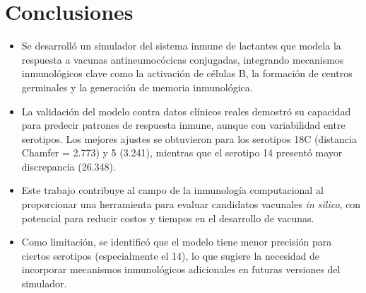 \chapter*{Conclusiones}\label{chapter:conclusions}

\begin{itemize}
    \item Se desarrolló un simulador  del sistema inmune de lactantes que modela la respuesta a vacunas antineumocócicas conjugadas, integrando mecanismos inmunológicos clave como la activación de células B, la formación de centros germinales y la generación de memoria inmunológica.

    \item La validación del modelo contra datos clínicos reales demostró su capacidad para predecir patrones de respuesta inmune, aunque con variabilidad entre serotipos. Los mejores ajustes se obtuvieron para los serotipos 18C (distancia Chamfer = 2.773) y 5 (3.241), mientras que el serotipo 14 presentó mayor discrepancia (26.348).

    \item Este trabajo contribuye al campo de la inmunología computacional al proporcionar una herramienta para evaluar candidatos vacunales \textit{in silico}, con potencial para reducir costos y tiempos en el desarrollo de vacunas. 

    \item Como limitación, se identificó que el modelo tiene menor precisión para ciertos serotipos (especialmente el 14), lo que sugiere la necesidad de incorporar mecanismos inmunológicos adicionales en futuras versiones del simulador.
\end{itemize}

